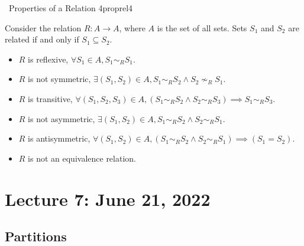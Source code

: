         \begin{exercise}{\Difficulty\,\Difficulty\,\,Properties of a Relation 4}{proprel4}
        
            Consider the relation \(R:A\to A\), where \(A\) is the set of all sets. Sets \(S_1\) and \(S_2\) are related if and only if \(S_1\subseteq S_2\).
            \begin{itemize}
                \item \(R\) is reflexive, \(\forall S_1\in A, S_1\sim_RS_1\).
                \item \(R\) is not symmetric, \(\exists (S_1,S_2)\in A, S_1\sim_RS_2\wedge S_2\nsim_RS_1\).
                \item \(R\) is transitive, \(\forall (S_1, S_2, S_3)\in A, (S_1\sim_RS_2\wedge S_2\sim_RS_3)\implies S_1\sim_RS_3\).
                \item \(R\) is not asymmetric, \(\exists (S_1, S_2)\in A,S_1\sim_RS_2\wedge S_2\sim_RS_1\).
                \item \(R\) is antisymmetric, \(\forall (S_1, S_2)\in A,(S_1\sim_RS_2\wedge S_2\sim_RS_1)\implies(S_1 = S_2)\).
                \item \(R\) is not an equivalence relation.
            \end{itemize}
        
        \end{exercise}

\section{Lecture 7: June 21, 2022}

    \subsection{Partitions}
    
